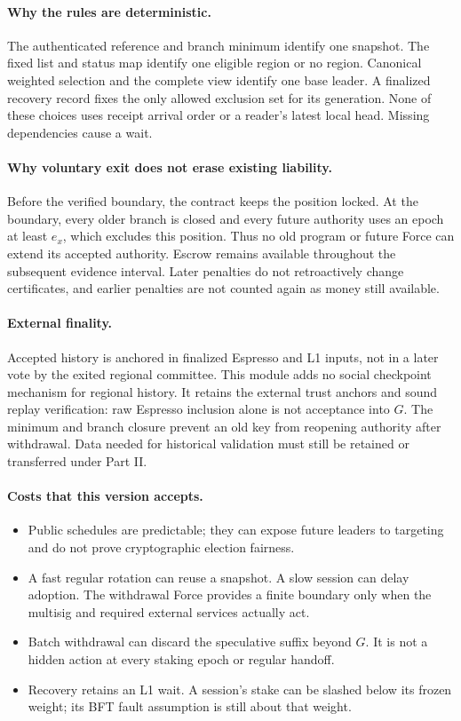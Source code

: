 \documentclass[11pt,a4paper]{article}
\begin{document}
\paragraph{Why the rules are deterministic.}
The authenticated reference and branch minimum identify one snapshot.
The fixed list and status map identify one eligible region or no region.
Canonical weighted selection and the complete view identify one base
leader. A finalized recovery record fixes the only allowed exclusion set
for its generation. None of these choices uses receipt arrival order or
a reader's latest local head. Missing dependencies cause a wait.

\paragraph{Why voluntary exit does not erase existing liability.}
Before the verified boundary, the contract keeps the position locked.
At the boundary, every older branch is closed and every future authority
uses an epoch at least $e_x$, which excludes this position. Thus no old
program or future Force can extend its accepted authority. Escrow remains
available throughout the subsequent evidence interval. Later penalties
do not retroactively change certificates, and earlier penalties are not
counted again as money still available.

\paragraph{External finality.}
Accepted history is anchored in finalized Espresso and L1 inputs, not in
a later vote by the exited regional committee. This module adds no social
checkpoint mechanism for regional history. It retains the external trust
anchors and sound replay verification: raw Espresso inclusion alone is
not acceptance into $G$. The minimum and branch closure prevent an old
key from reopening authority after withdrawal. Data needed for historical
validation must still be retained or transferred under Part II.

\paragraph{Costs that this version accepts.}
\begin{itemize}[itemsep=2pt]
\item Public schedules are predictable; they can expose future leaders
to targeting and do not prove cryptographic election fairness.
\item A fast regular rotation can reuse a snapshot. A slow session can
delay adoption. The withdrawal Force provides a finite boundary only
when the multisig and required external services actually act.
\item Batch withdrawal can discard the speculative suffix beyond $G$.
It is not a hidden action at every staking epoch or regular handoff.
\item Recovery retains an L1 wait. A session's stake can be slashed below
its frozen weight; its BFT fault assumption is still about that weight.
\end{itemize}
\end{document}
